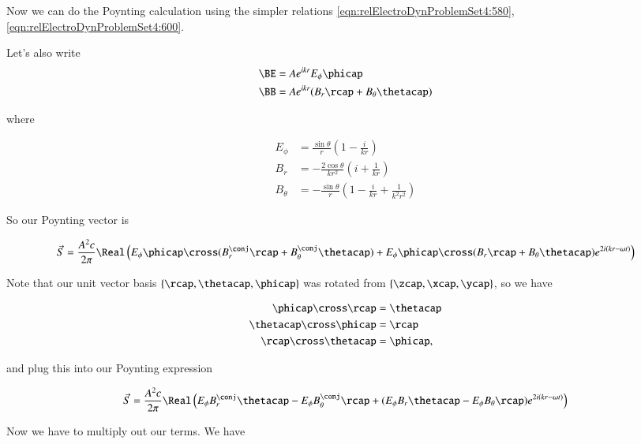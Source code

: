 Now we can do the Poynting calculation using the simpler relations \ref{eqn:relElectroDynProblemSet4:580}, \ref{eqn:relElectroDynProblemSet4:600}.

Let's also write
\begin{align}\label{eqn:relElectroDynProblemSet4:655}
\BE &= A e^{i k r} E_\phi \phicap \\
\BB &= A e^{i k r} ( B_r \rcap + B_\theta \thetacap )
\end{align}

where

\begin{align}\label{eqn:relElectroDynProblemSet4:660}
E_\phi &= \frac{\sin\theta}{r} \left( 1 - \frac{i}{k r} \right)  \\
B_r &= -\frac{2 \cos\theta}{k r^2} \left( i + \frac{1}{k r} \right)  \\
B_\theta &= - \frac{\sin\theta}{r} \left( 1 - \frac{i}{k r} + \frac{1}{k^2 r^2} \right) 
\end{align}

So our Poynting vector is

\begin{align*}
\vec{S} 
&= \frac{A^2 c}{2 \pi} \Real
\left(
E_\phi \phicap \cross ( B_r^\conj \rcap + B_\theta^\conj \thetacap )
+
E_\phi \phicap \cross ( B_r \rcap + B_\theta \thetacap ) e^{ 2 i ( k r - \omega t ) }
\right) \\
\end{align*}

Note that our unit vector basis $\{ \rcap, \thetacap, \phicap \}$ was rotated from $\{ \zcap, \xcap, \ycap \}$, so we have

\begin{align}\label{eqn:relElectroDynProblemSet4:670}
\phicap \cross \rcap &= \thetacap \\
\thetacap \cross \phicap &= \rcap \\
\rcap \cross \thetacap &= \phicap ,
\end{align}

and plug this into our Poynting expression

\begin{align*}
\vec{S} 
&= \frac{A^2 c}{2 \pi} \Real
\left(
E_\phi B_r^\conj \thetacap 
-E_\phi B_\theta^\conj \rcap 
+(E_\phi B_r \thetacap 
-E_\phi B_\theta \rcap )
e^{ 2 i ( k r - \omega t ) }
\right) \\
\end{align*}

Now we have to multiply out our terms.  We have


